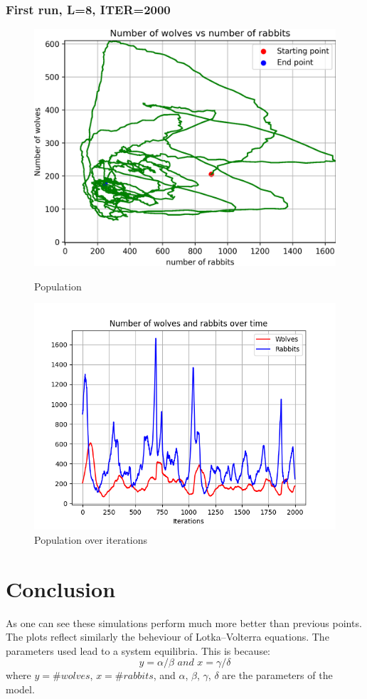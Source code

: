 \documentclass[unicode,11pt,a4paper,oneside,numbers=endperiod,openany]{scrartcl}
\begin{document}
\subsubsection*{First run, L=8, ITER=2000}
\begin{figure}[H]
  \centering
  \begin{minipage}[b]{0.435\textwidth}
    \centering
    \includegraphics[width=\textwidth]{output_main/Bestnew2_populations.png}
    \caption{Population}
  \end{minipage}
  \hfill
  \begin{minipage}[b]{0.49\textwidth}
    \centering
    \includegraphics[width=\textwidth]{output_main/Bestnew2.png}
    \caption{Population over iterations}
  \end{minipage}
\end{figure}
\section*{Conclusion}
As one can see these simulations perform much more better than previous points. \\
The plots reflect similarly the beheviour of Lotka–Volterra equations. The parameters used lead to a system equilibria. This is because:\\
\[ y=\alpha/\beta \textit{ and } x= \gamma/\delta\]
where $y=\#wolves$, $x=\#rabbits$, and $\alpha$, $\beta$, $\gamma$, $\delta$ are the parameters of the model.
\end{document}
